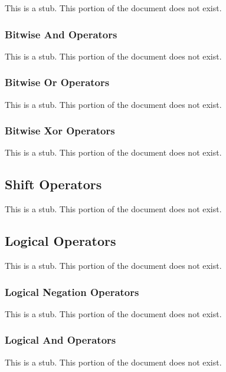 This is a stub.  This portion of the document does not exist.

\subsubsection{Bitwise And Operators}
\label{Bitwise_And_Operators}

This is a stub.  This portion of the document does not exist.

\subsubsection{Bitwise Or Operators}
\label{Bitwise_Or_Operators}

This is a stub.  This portion of the document does not exist.

\subsubsection{Bitwise Xor Operators}
\label{Bitwise_Xor_Operators}

This is a stub.  This portion of the document does not exist.

\subsection{Shift Operators}
\label{Shift_Operators}

This is a stub.  This portion of the document does not exist.

\subsection{Logical Operators}
\label{Logical_Operators}

This is a stub.  This portion of the document does not exist.

\subsubsection{Logical Negation Operators}
\label{Logical_Negation_Operators}

This is a stub.  This portion of the document does not exist.

\subsubsection{Logical And Operators}
\label{Logical_And_Operators}

This is a stub.  This portion of the document does not exist.

